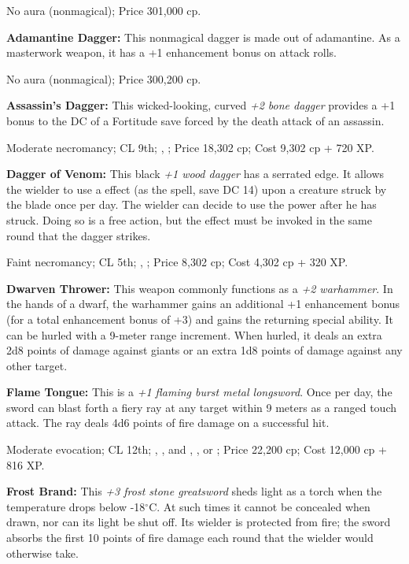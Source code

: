 No aura (nonmagical); Price 301,000 cp.


\textbf{Adamantine Dagger:} This nonmagical dagger is made out of adamantine. As a masterwork weapon, it has a +1 enhancement bonus on attack rolls.

No aura (nonmagical); Price 300,200 cp.


\textbf{Assassin's Dagger:} This wicked-looking, curved \emph{+2 bone dagger} provides a +1 bonus to the DC of a Fortitude save forced by the death attack of an assassin.

Moderate necromancy; CL 9th; , ; Price 18,302 cp; Cost 9,302 cp + 720 XP.


\textbf{Dagger of Venom:} This black \emph{+1 wood dagger} has a serrated edge. It allows the wielder to use a  effect (as the spell, save DC 14) upon a creature struck by the blade once per day. The wielder can decide to use the power after he has struck. Doing so is a free action, but the  effect must be invoked in the same round that the dagger strikes.

Faint necromancy; CL 5th; , ; Price 8,302 cp; Cost 4,302 cp + 320 XP.

% 
\textbf{Dwarven Thrower:} This weapon commonly functions as a \emph{+2  warhammer}. In the hands of a dwarf, the warhammer gains an additional +1 enhancement bonus (for a total enhancement bonus of +3) and gains the returning special ability. It can be hurled with a 9-meter range increment. When hurled, it deals an extra 2d8 points of damage against giants or an extra 1d8 points of damage against any other target.



\textbf{Flame Tongue:} This is a \emph{+1 flaming burst metal longsword}. Once per day, the sword can blast forth a fiery ray at any target within 9 meters as a ranged touch attack. The ray deals 4d6 points of fire damage on a successful hit.

Moderate evocation; CL 12th; , , and , , or ; Price 22,200 cp; Cost 12,000 cp + 816 XP.


\textbf{Frost Brand:} This \emph{+3 frost stone greatsword} sheds light as a torch when the temperature drops below -18$^\circ$C. At such times it cannot be concealed when drawn, nor can its light be shut off. Its wielder is protected from fire; the sword absorbs the first 10 points of fire damage each round that the wielder would otherwise take.

